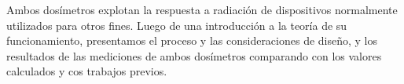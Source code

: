 Ambos dosímetros explotan la respuesta a radiación de dispositivos 
normalmente utilizados para otros fines. 
Luego de una introducción a la teoría de su funcionamiento,
presentamos el proceso y las consideraciones de diseño,
y los resultados de las mediciones de ambos dosímetros 
comparando con los valores calculados y cos trabajos previos.
